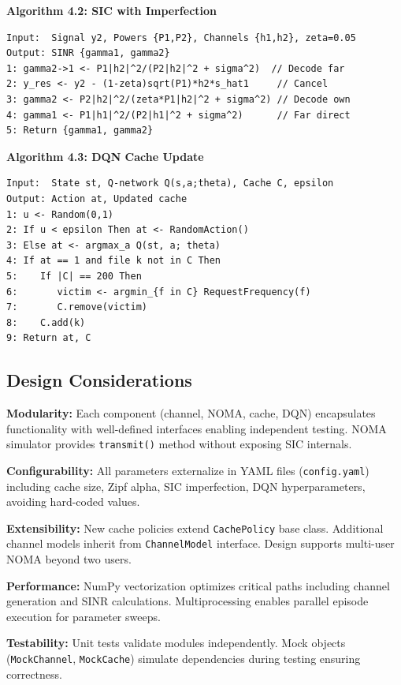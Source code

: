 \documentclass[12pt,a4paper]{article}
\begin{document}
\textbf{Algorithm 4.2: SIC with Imperfection}
\begin{verbatim}
Input:  Signal y2, Powers {P1,P2}, Channels {h1,h2}, zeta=0.05
Output: SINR {gamma1, gamma2}
1: gamma2->1 <- P1|h2|^2/(P2|h2|^2 + sigma^2)  // Decode far
2: y_res <- y2 - (1-zeta)sqrt(P1)*h2*s_hat1     // Cancel
3: gamma2 <- P2|h2|^2/(zeta*P1|h2|^2 + sigma^2) // Decode own
4: gamma1 <- P1|h1|^2/(P2|h1|^2 + sigma^2)      // Far direct
5: Return {gamma1, gamma2}
\end{verbatim}

\textbf{Algorithm 4.3: DQN Cache Update}
\begin{verbatim}
Input:  State st, Q-network Q(s,a;theta), Cache C, epsilon
Output: Action at, Updated cache
1: u <- Random(0,1)
2: If u < epsilon Then at <- RandomAction()
3: Else at <- argmax_a Q(st, a; theta)
4: If at == 1 and file k not in C Then
5:    If |C| == 200 Then
6:       victim <- argmin_{f in C} RequestFrequency(f)
7:       C.remove(victim)
8:    C.add(k)
9: Return at, C
\end{verbatim}

\subsection{Design Considerations}

\textbf{Modularity:} Each component (channel, NOMA, cache, DQN) encapsulates functionality with well-defined interfaces enabling independent testing. NOMA simulator provides \texttt{transmit()} method without exposing SIC internals.

\textbf{Configurability:} All parameters externalize in YAML files (\texttt{config.yaml}) including cache size, Zipf alpha, SIC imperfection, DQN hyperparameters, avoiding hard-coded values.

\textbf{Extensibility:} New cache policies extend \texttt{CachePolicy} base class. Additional channel models inherit from \texttt{ChannelModel} interface. Design supports multi-user NOMA beyond two users.

\textbf{Performance:} NumPy vectorization optimizes critical paths including channel generation and SINR calculations. Multiprocessing enables parallel episode execution for parameter sweeps.

\textbf{Testability:} Unit tests validate modules independently. Mock objects (\texttt{MockChannel}, \texttt{MockCache}) simulate dependencies during testing ensuring correctness.

\thispagestyle{plain}
\end{document}
